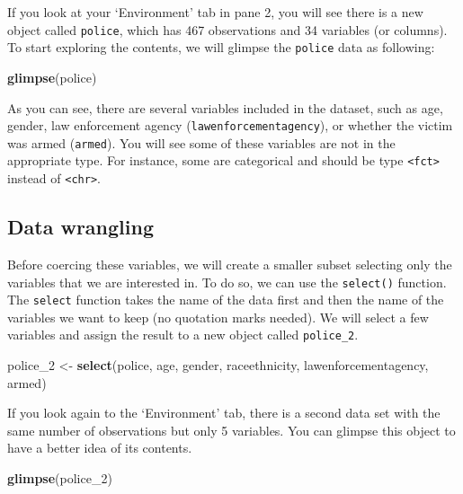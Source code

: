 \documentclass[
]{book}
\newenvironment{Shaded}{\begin{snugshade}}{\end{snugshade}}
\newcommand{\FunctionTok}[1]{\textcolor[rgb]{0.13,0.29,0.53}{\textbf{#1}}}
\newcommand{\NormalTok}[1]{#1}
\newcommand{\OtherTok}[1]{\textcolor[rgb]{0.56,0.35,0.01}{#1}}
\begin{document}
If you look at your `Environment' tab in pane 2, you will see there is a new object called \texttt{police}, which has 467 observations and 34 variables (or columns). To start exploring the contents, we will glimpse the \texttt{police} data as following:

\begin{Shaded}
\begin{Highlighting}[]
\FunctionTok{glimpse}\NormalTok{(police)}
\end{Highlighting}
\end{Shaded}

As you can see, there are several variables included in the dataset, such as age, gender, law enforcement agency (\texttt{lawenforcementagency}), or whether the victim was armed (\texttt{armed}). You will see some of these variables are not in the appropriate type. For instance, some are categorical and should be type \texttt{\textless{}fct\textgreater{}} instead of \texttt{\textless{}chr\textgreater{}}.

\hypertarget{data-wrangling}{%
\subsection{Data wrangling}\label{data-wrangling}}

Before coercing these variables, we will create a smaller subset selecting only the variables that we are interested in. To do so, we can use the \texttt{select()} function. The \texttt{select} function takes the name of the data first and then the name of the variables we want to keep (no quotation marks needed). We will select a few variables and assign the result to a new object called \texttt{police\_2}.

\begin{Shaded}
\begin{Highlighting}[]
\NormalTok{police\_2 }\OtherTok{\textless{}{-}} \FunctionTok{select}\NormalTok{(police, age, gender, raceethnicity, lawenforcementagency, armed)}
\end{Highlighting}
\end{Shaded}

If you look again to the `Environment' tab, there is a second data set with the same number of observations but only 5 variables. You can glimpse this object to have a better idea of its contents.

\begin{Shaded}
\begin{Highlighting}[]
\FunctionTok{glimpse}\NormalTok{(police\_2)}
\end{Highlighting}
\end{Shaded}
\end{document}
